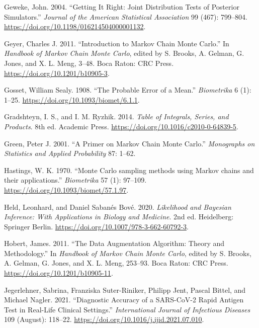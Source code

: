 \documentclass[
  11pt,
  letterpaper,
]{scrbook}
\newlength{\cslhangindent}
\newenvironment{CSLReferences}[2] %
 {\begin{list}{}{%
  \setlength{\itemindent}{0pt}
  \setlength{\leftmargin}{0pt}
  \setlength{\parsep}{0pt}
  \ifodd #1
   \setlength{\leftmargin}{\cslhangindent}
   \setlength{\itemindent}{-1\cslhangindent}
  \fi
  \setlength{\itemsep}{#2\baselineskip}}}
 {\end{list}}
\theoremstyle{definition}
\theoremstyle{plain}
\theoremstyle{plain}
\theoremstyle{definition}
\theoremstyle{definition}
\theoremstyle{remark}
\begin{document}
\begin{CSLReferences}{1}{0}
Geweke, John. 2004. {``Getting It Right: Joint Distribution Tests of
Posterior Simulators.''} \emph{Journal of the American Statistical
Association} 99 (467): 799--804.
\url{https://doi.org/10.1198/016214504000001132}.

Geyer, Charles J. 2011. {``Introduction to {M}arkov Chain {M}onte
{C}arlo.''} In \emph{Handbook of {M}arkov Chain {M}onte {C}arlo}, edited
by S. Brooks, A. Gelman, G. Jones, and X. L. Meng, 3--48. Boca Raton:
CRC Press. \url{https://doi.org/10.1201/b10905-3}.

Gosset, William Sealy. 1908. {``The Probable Error of a Mean.''}
\emph{Biometrika} 6 (1): 1--25.
\url{https://doi.org/10.1093/biomet/6.1.1}.

Gradshteyn, I. S., and I. M. Ryzhik. 2014. \emph{Table of Integrals,
Series, and Products}. 8th ed. Academic Press.
\url{https://doi.org/10.1016/c2010-0-64839-5}.

Green, Peter J. 2001. {``A Primer on {M}arkov Chain {M}onte {C}arlo.''}
\emph{Monographs on Statistics and Applied Probability} 87: 1--62.

Hastings, W. K. 1970. {``{Monte {C}arlo sampling methods using {M}arkov
chains and their applications}.''} \emph{Biometrika} 57 (1): 97--109.
\url{https://doi.org/10.1093/biomet/57.1.97}.

Held, Leonhard, and Daniel Sabanés Bové. 2020. \emph{Likelihood and
{B}ayesian Inference: With Applications in Biology and Medicine}. 2nd
ed. Heidelberg: Springer Berlin.
\url{https://doi.org/10.1007/978-3-662-60792-3}.

Hobert, James. 2011. {``The Data Augmentation Algorithm: Theory and
Methodology.''} In \emph{Handbook of {M}arkov Chain {M}onte {C}arlo},
edited by S. Brooks, A. Gelman, G. Jones, and X. L. Meng, 253--93. Boca
Raton: CRC Press. \url{https://doi.org/10.1201/b10905-11}.

Jegerlehner, Sabrina, Franziska Suter-Riniker, Philipp Jent, Pascal
Bittel, and Michael Nagler. 2021. {``Diagnostic Accuracy of a
{SARS-CoV-2} Rapid Antigen Test in Real-Life Clinical Settings.''}
\emph{International Journal of Infectious Diseases} 109 (August):
118--22. \url{https://doi.org/10.1016/j.ijid.2021.07.010}.


\end{CSLReferences}
\end{document}
